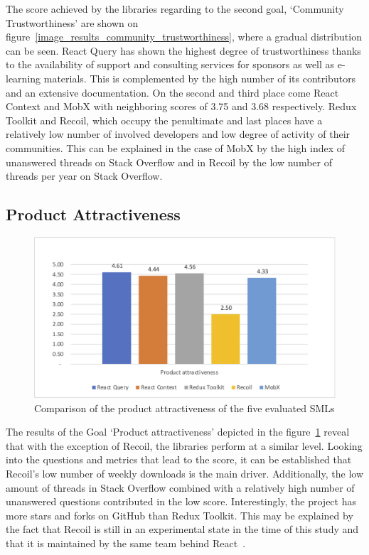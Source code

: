 The score achieved by the libraries regarding to the second goal,
`Community Trustworthiness' are shown on figure~\ref{image_results_community_trustworthiness},
where a gradual
distribution can be seen. React Query has shown the highest degree of
trustworthiness thanks to the availability of support and consulting
services for sponsors as well as e-learning materials. This is
complemented by the high number of its contributors and an extensive
documentation. On the second and third place come React Context and MobX
with neighboring scores of 3.75 and 3.68 respectively. Redux Toolkit and
Recoil, which occupy the penultimate and last places have a relatively
low number of involved developers and low degree of activity of their
communities. This can be explained in the case of MobX by the high index
of unanswered threads on Stack Overflow and in Recoil by the low number
of threads per year on Stack Overflow.

\hypertarget{product-attractiveness}{%
    \subsection{Product Attractiveness}\label{product-attractiveness}}

\begin{figure}
    \centering
    \includegraphics{images/chart_attractiveness}
\caption{Comparison of the product attractiveness of the five evaluated SMLs}
\label{image_results_product_attractiveness}
\end{figure}

The results of the Goal `Product attractiveness' depicted in the figure~\ref{image_results_product_attractiveness} reveal that with the exception of Recoil, the libraries perform at
a similar level. Looking into the questions and metrics that lead to the
score, it can be established that Recoil's low number of weekly
downloads is the main driver. Additionally, the low amount of threads in
Stack Overflow combined with a relatively high number of unanswered
questions contributed in the low score. Interestingly, the project has
more stars and forks on GitHub than Redux Toolkit. This may be explained
by the fact that Recoil is still in an experimental state in the time of
this study and that it is maintained by the same team behind React~\cite{recoil}.

